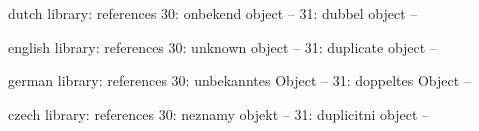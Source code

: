 

\unprotect

\startmessages  dutch  library: references
     30: onbekend object --
     31: dubbel object --
\stopmessages

\startmessages  english  library: references
     30: unknown object --
     31: duplicate object --
\stopmessages

\startmessages  german  library: references
     30: unbekanntes Object --
     31: doppeltes Object --
\stopmessages

\startmessages  czech  library: references
     30: neznamy objekt --
     31: duplicitni object --
\stopmessages


\newif\ifinobject

